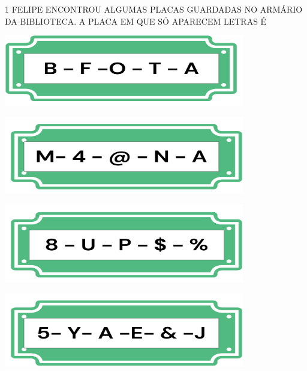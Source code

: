 
\num{1} FELIPE ENCONTROU ALGUMAS PLACAS GUARDADAS NO ARMÁRIO DA BIBLIOTECA. A
PLACA EM QUE SÓ APARECEM LETRAS É

\begin{escolha}
\item \includegraphics[width=.9\textwidth]{media/image82a.png}

\item \includegraphics[width=.9\textwidth]{media/image82b.png}

\item \includegraphics[width=.9\textwidth]{media/image82c.png}

\item \includegraphics[width=.9\textwidth]{media/image82d.png}
\end{escolha}

\pagebreak

